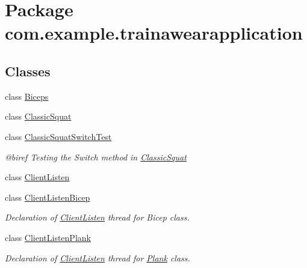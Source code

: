 \hypertarget{namespacecom_1_1example_1_1trainawearapplication}{}\section{Package com.\+example.\+trainawearapplication}
\label{namespacecom_1_1example_1_1trainawearapplication}
\subsection*{Classes}
\begin{DoxyCompactItemize}
\item 
class \mbox{\hyperlink{classcom_1_1example_1_1trainawearapplication_1_1_biceps}{Biceps}}
\item 
class \mbox{\hyperlink{classcom_1_1example_1_1trainawearapplication_1_1_classic_squat}{Classic\+Squat}}
\item 
class \mbox{\hyperlink{classcom_1_1example_1_1trainawearapplication_1_1_classic_squat_switch_test}{Classic\+Squat\+Switch\+Test}}
\begin{DoxyCompactList}\small\item\em @biref Testing the Switch method in \mbox{\hyperlink{classcom_1_1example_1_1trainawearapplication_1_1_classic_squat}{Classic\+Squat}} \end{DoxyCompactList}\item 
class \mbox{\hyperlink{classcom_1_1example_1_1trainawearapplication_1_1_client_listen}{Client\+Listen}}
\item 
class \mbox{\hyperlink{classcom_1_1example_1_1trainawearapplication_1_1_client_listen_bicep}{Client\+Listen\+Bicep}}
\begin{DoxyCompactList}\small\item\em Declaration of \mbox{\hyperlink{classcom_1_1example_1_1trainawearapplication_1_1_client_listen}{Client\+Listen}} thread for Bicep class. \end{DoxyCompactList}\item 
class \mbox{\hyperlink{classcom_1_1example_1_1trainawearapplication_1_1_client_listen_plank}{Client\+Listen\+Plank}}
\begin{DoxyCompactList}\small\item\em Declaration of \mbox{\hyperlink{classcom_1_1example_1_1trainawearapplication_1_1_client_listen}{Client\+Listen}} thread for \mbox{\hyperlink{classcom_1_1example_1_1trainawearapplication_1_1_plank}{Plank}} class. \end{DoxyCompactList}\item 

\end{DoxyCompactItemize}

